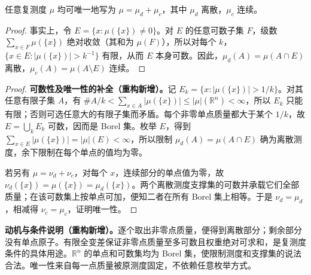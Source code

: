 \documentclass[../../main.tex]{subfiles}%
\begin{document}
\begin{proposition}\label{proposition:ch03-discrete-continuous-decomposition}
任意复测度 $\mu$ 均可唯一地写为 $\mu=\mu_d+\mu_c$，其中 $\mu_d$ 离散，$\mu_c$ 连续。
\end{proposition}
\begin{proof}
事实上，令 $E=\{x:\mu(\{x\})\ne0\}$。对 $E$ 的任意可数子集 $F$，级数 $\sum_{x\in F}\mu(\{x\})$ 绝对收敛（其和为 $\mu(F)$），所以对每个 $k$，$\{x\in E:|\mu(\{x\})|>k^{-1}\}$ 有限，从而 $E$ 本身可数。因此，$\mu_d(A)=\mu(A\cap E)$ 离散，$\mu_c(A)=\mu(A\setminus E)$ 连续。
\end{proof}
\begin{proof}
\textbf{可数性及唯一性的补全（重构新增）。}记 $E_k=\{x:|\mu(\{x\})|>1/k\}$。对其任意有限子集 $A$，有 $\#A/k<\sum_{x\in A}|\mu(\{x\})|\le|\mu|(\mathbb R^n)<\infty$，所以 $E_k$ 只能有限；否则可选任意大的有限子集而矛盾。每个非零单点质量都大于某个 $1/k$，故 $E=\bigcup_kE_k$ 可数，因而是 Borel 集。枚举 $E$，得到 $\sum_{x\in E}|\mu(\{x\})|=|\mu|(E)<\infty$，所以限制 $\mu_d(A)=\mu(A\cap E)$ 确为离散测度，余下限制在每个单点的值均为零。

若另有 $\mu=\nu_d+\nu_c$，对每个 $x$，连续部分的单点值为零，故 $\nu_d(\{x\})=\mu(\{x\})=\mu_d(\{x\})$。两个离散测度支撑集的可数并承载它们全部质量；在该可数集上按单点可加，便知二者在所有 Borel 集上相等。于是 $\nu_d=\mu_d$，相减得 $\nu_c=\mu_c$，证明唯一性。
\end{proof}
\begin{remark}
\textbf{动机与条件说明（重构新增）。}逐个取出非零点质量，便得到离散部分；剩余部分没有单点原子。有限全变差保证非零点质量至多可数且权重绝对可求和，是复测度条件的具体用途。$\mathbb R^n$ 的单点和可数集均为 Borel 集，使限制测度和支撑集的说法合法。唯一性来自每一点质量被原测度固定，不依赖任意枚举方式。
\end{remark}
\end{document}
